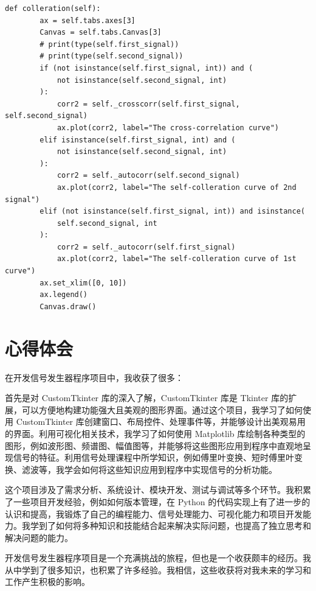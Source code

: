 \documentclass[12pt]{ctexart}
\begin{document}
\begin{lstlisting}[title=时差域分析]
      def colleration(self):
        ax = self.tabs.axes[3]
        Canvas = self.tabs.Canvas[3]
        # print(type(self.first_signal))
        # print(type(self.second_signal))
        if (not isinstance(self.first_signal, int)) and (
            not isinstance(self.second_signal, int)
        ):
            corr2 = self._crosscorr(self.first_signal, self.second_signal)
            ax.plot(corr2, label="The cross-correlation curve")
        elif isinstance(self.first_signal, int) and (
            not isinstance(self.second_signal, int)
        ):
            corr2 = self._autocorr(self.second_signal)
            ax.plot(corr2, label="The self-colleration curve of 2nd signal")
        elif (not isinstance(self.first_signal, int)) and isinstance(
            self.second_signal, int
        ):
            corr2 = self._autocorr(self.first_signal)
            ax.plot(corr2, label="The self-colleration curve of 1st curve")
        ax.set_xlim([0, 10])
        ax.legend()
        Canvas.draw()
\end{lstlisting}
\section{心得体会}


在开发信号发生器程序项目中，我收获了很多：

首先是对 CustomTkinter 库的深入了解，CustomTkinter 库是 Tkinter 库的扩展，可以方便地构建功能强大且美观的图形界面。通过这个项目，我学习了如何使用 CustomTkinter 库创建窗口、布局控件、处理事件等，并能够设计出美观易用的界面。利用可视化相关技术，我学习了如何使用 Matplotlib 库绘制各种类型的图形，例如波形图、频谱图、幅值图等，并能够将这些图形应用到程序中直观地呈现信号的特征。利用信号处理课程中所学知识，例如傅里叶变换、短时傅里叶变换、滤波等，我学会如何将这些知识应用到程序中实现信号的分析功能。

这个项目涉及了需求分析、系统设计、模块开发、测试与调试等多个环节。我积累了一些项目开发经验，例如如何版本管理，在 Python 的代码实现上有了进一步的认识和提高，我锻炼了自己的编程能力、信号处理能力、可视化能力和项目开发能力。我学到了如何将多种知识和技能结合起来解决实际问题，也提高了独立思考和解决问题的能力。

开发信号发生器程序项目是一个充满挑战的旅程，但也是一个收获颇丰的经历。我从中学到了很多知识，也积累了许多经验。我相信，这些收获将对我未来的学习和工作产生积极的影响。
\end{document}
